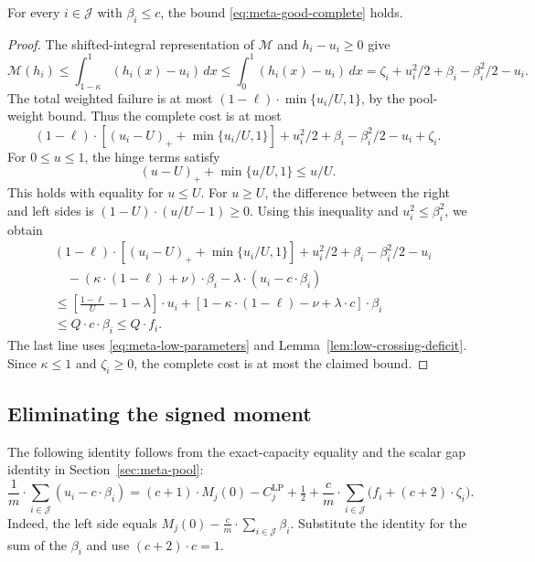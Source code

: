\begin{lemma}
\label{lem:meta-bad-charge}
For every $i\in\mathcal J$ with $\beta_i\le c$,
the bound \eqref{eq:meta-good-complete} holds.
\end{lemma}
\begin{proof}
The shifted-integral representation of $\mathcal M$ and $h_i-u_i\ge0$ give
\[
 \mathcal M(h_i)\le\int_{1-\kappa}^1(h_i(x)-u_i)\,dx
 \le\int_0^1(h_i(x)-u_i)\,dx
 =\zeta_i+u_i^2/2+\beta_i-\beta_i^2/2-u_i.
\]
The total weighted failure is at most
$(1-\ell)\cdot\min\{u_i/U,1\}$, by the pool-weight bound.
Thus the complete cost is at most
\[
 (1-\ell)\cdot[(u_i-U)_++\min\{u_i/U,1\}]
 +u_i^2/2+\beta_i-\beta_i^2/2-u_i+\zeta_i.
\]
For $0\le u\le1$, the hinge terms satisfy
\[
 (u-U)_++\min\{u/U,1\}\le u/U.
\]
This holds with equality for $u\le U$. For $u\ge U$, the difference
between the right and left sides is $(1-U)\cdot(u/U-1)\ge0$.
Using this inequality and $u_i^2\le\beta_i^2$, we obtain
\begin{align*}
 &(1-\ell)\cdot[(u_i-U)_++\min\{u_i/U,1\}]
   +u_i^2/2+\beta_i-\beta_i^2/2-u_i\\
 &\quad-(\kappa\cdot(1-\ell)+\nu)\cdot\beta_i
   -\lambda\cdot(u_i-c\cdot\beta_i)\\
 &\le\left[\frac{1-\ell}{U}-1-\lambda\right]\cdot u_i
   +[1-\kappa\cdot(1-\ell)-\nu+\lambda\cdot c]\cdot\beta_i\\
 &\le Q\cdot c\cdot\beta_i
 \le Q\cdot f_i.
\end{align*}
The last line uses \eqref{eq:meta-low-parameters} and
Lemma~\ref{lem:low-crossing-deficit}. Since $\kappa\le1$ and
$\zeta_i\ge0$, the complete cost is at most the claimed bound.
\end{proof}

\subsection{Eliminating the signed moment}
The following identity follows from the exact-capacity equality and the
scalar gap identity in Section~\ref{sec:meta-pool}:
\begin{equation}
 \frac1m\cdot\sum_{i\in\mathcal J}(u_i-c\cdot\beta_i)
 =(c+1)\cdot M_j(0)-C_j^{\mathrm{LP}}+\tfrac12
 +\frac{c}{m}\cdot\sum_{i\in\mathcal J}\bigl(f_i+(c+2)\cdot\zeta_i\bigr).
 \label{eq:meta-moment-identities}
\end{equation}
Indeed, the left side equals
$M_j(0)-\frac{c}{m}\cdot\sum_{i\in\mathcal J}\beta_i$. Substitute the
identity for the sum of the $\beta_i$ and use $(c+2)\cdot c=1$.

